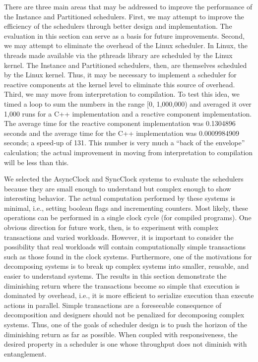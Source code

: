 There are three main areas that may be addressed to improve the performance of the Instance and Partitioned schedulers.
First, we may attempt to improve the efficiency of the schedulers through better design and implementation.
The evaluation in this section can serve as a basis for future improvements.
Second, we may attempt to eliminate the overhead of the Linux scheduler.
In Linux, the threads made available via the pthreads library are scheduled by the Linux kernel.
The Instance and Partitioned schedulers, then, are themselves scheduled by the Linux kernel.
Thus, it may be necessary to implement a scheduler for reactive components at the kernel level to eliminate this source of overhead.
Third, we may move from interpretation to compilation.
To test this idea, we timed a loop to sum the numbers in the range [0, 1,000,000) and averaged it over 1,000 runs for a C++ implementation and a reactive component implementation.
The average time for the reactive component implementation was 0.1304896 seconds and the average time for the C++ implementation was 0.0009984909 seconds; a speed-up of 131.
This number is very much a ``back of the envelope'' calculation; the actual improvement in moving from interpretation to compilation will be less than this.


We selected the AsyncClock and SyncClock systems to evaluate the schedulers because they are small enough to understand but complex enough to show interesting behavior.
The actual computation performed by these systems is minimal, i.e., setting boolean flags and incrementing counters.
Most likely, these operations can be performed in a single clock cycle (for compiled programs).
One obvious direction for future work, then, is to experiment with complex transactions and varied workloads.
However, it is important to consider the possibility that real workloads will contain computationally simple transactions such as those found in the clock systems.
Furthermore, one of the motivations for decomposing systems is to break up complex systems into smaller, reusable, and easier to understand systems.
The results in this section demonstrate the diminishing return where the transactions become so simple that execution is dominated by overhead, i.e., it is more efficient to serialize execution than execute actions in parallel.
Simple transactions are a foreseeable consequence of decomposition and designers should not be penalized for decomposing complex systems.
Thus, one of the goals of scheduler design is to push the horizon of the diminishing return as far as possible.
When coupled with responsiveness, the desired property in a scheduler is one whose throughput does not diminish with entanglement.

